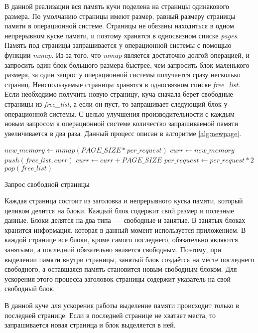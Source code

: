 В данной реализации вся память кучи поделена на страницы одинакового размера. По умолчанию страницы имеют размер, равный размеру страницы памяти в операционной системе. Страницы не обязаны находиться в одном непрерывном куске памяти, и поэтому хранятся в односвязном списке \textit{pages}. Память под страницы запрашивается у операционной системы с помощью функции \textit{mmap}. Из-за того, что \textit{mmap} является достаточно долгой операцией, и запросить один блок большого размера быстрее, чем запросить блок маленького размера, за один запрос у операционной системы получается сразу несколько страниц. Неиспользуемые страницы хранятся в односвязном списке \textit{free\_list}. Если необходимо получить новую страницу, куча сначала берет свободные страницы из \textit{free\_list}, а если он пуст, то запрашивает следующий блок у операционной системы. С целью улучшения производительности с каждым новым запросом к операционной системе количество запрашиваемой памяти увеличивается в два раза. Данный процесс описан в алгоритме \ref{alg:newpage}.

\begin{algorithm}[h]
\begin{algorithmic}[1]
    \State $new\_memory \gets mmap(PAGE\_SIZE * per\_request)$
    \State $curr \gets new\_memory$
        \State $push(free\_list, curr)$
        \State $curr \gets curr + PAGE\_SIZE$ 
    \EndWhile
    \State $per\_request \gets per\_request * 2$
\EndIf
\State \Return $pop(free\_list)$ 
\end{algorithmic}
\caption{Запрос свободной страницы}\label{alg:newpage}
\end{algorithm}

Каждая страница состоит из заголовка и непрерывного куска памяти, который целиком делится на блоки. Каждый блок содержит свой размер и полезные данные.
Блоки делятся на два типа~--- свободные и занятые. В занятых блоках хранится информация, которая в данный момент используется приложением. В каждой странице все блоки, кроме самого последнего, обязательно являются занятыми, а последний обязательно является свободным. Поэтому, при выделении памяти внутри страницы, занятый блок создаётся на месте последнего свободного, а оставшаяся память становится новым свободным блоком. Для ускорения этого процесса заголовок страницы содержит указатель на свой свободный блок.

В данной куче для ускорения работы выделение памяти происходит только в последней странице. Если в последней странице не хватает места, то запрашивается новая страница и блок выделяется в ней. 

